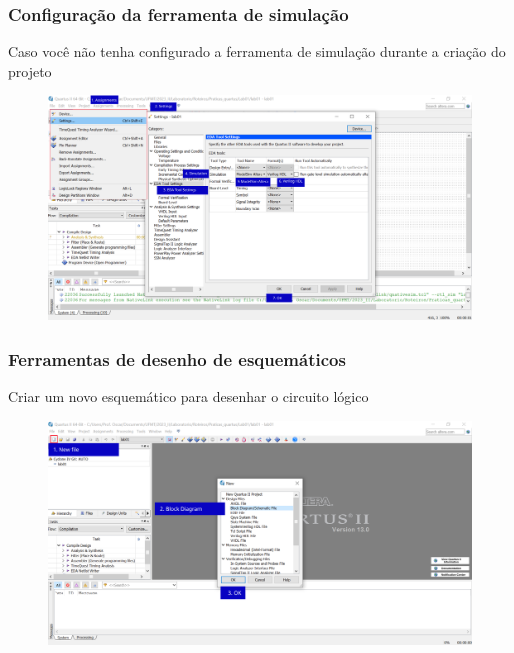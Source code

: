 \documentclass{CPSPresentation}
\begin{document}
\begin{frame}
	\frametitle{Configuração da ferramenta de simulação}
	
	\begin{block}{}
		\justifying
		Caso você não tenha configurado a ferramenta de simulação durante a criação do projeto
	\end{block}
	
	\begin{figure}[h]
		\centering
		\includegraphics[width=1.02\textwidth]{quartus/fig22.pdf}
	\end{figure}
	
	
\end{frame}
\begin{frame}
	\frametitle{Ferramentas de desenho de esquemáticos}
	
	\begin{block}{}
		\justifying
		Criar um novo esquemático para desenhar o circuito lógico
	\end{block}
	
	\begin{figure}[h]
		\centering
		\includegraphics[width=1.02\textwidth]{quartus/fig26.pdf}
	\end{figure}
	
	
\end{frame}
\end{document}

